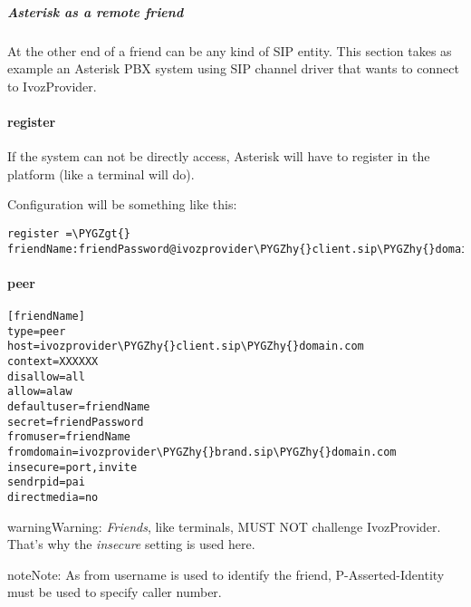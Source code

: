 \documentclass[letterpaper,10pt,english]{sphinxmanual}
\def\PYGZgt{\char`\>}
\def\PYGZhy{\char`\-}
\begin{document}
\subparagraph{Asterisk as a remote friend}
\label{administration_portal/client/vpbx/routing_endpoints/friends/remote_friends:asterisk-as-a-remote-friend}
At the other end of a friend can be any kind of SIP entity. This section takes
as example an Asterisk PBX system using SIP channel driver that wants to connect
to IvozProvider.
\paragraph{register}

If the system can not be directly access, Asterisk will have to register in the
platform (like a terminal will do).

Configuration will be something like this:

\begin{Verbatim}[commandchars=\\\{\}]
register =\PYGZgt{} friendName:friendPassword@ivozprovider\PYGZhy{}client.sip\PYGZhy{}domain.com
\end{Verbatim}
\paragraph{peer}

\begin{Verbatim}[commandchars=\\\{\}]
[friendName]
type=peer
host=ivozprovider\PYGZhy{}client.sip\PYGZhy{}domain.com
context=XXXXXX
disallow=all
allow=alaw
defaultuser=friendName
secret=friendPassword
fromuser=friendName
fromdomain=ivozprovider\PYGZhy{}brand.sip\PYGZhy{}domain.com
insecure=port,invite
sendrpid=pai
directmedia=no
\end{Verbatim}

\begin{notice}{warning}{Warning:}
\emph{Friends}, like terminals, MUST NOT challenge IvozProvider. That's
why the \emph{insecure} setting is used here.
\end{notice}

\begin{notice}{note}{Note:}
As from username is used to identify the friend, P-Asserted-Identity must be used to specify caller number.
\end{notice}
\end{document}
